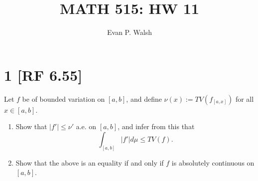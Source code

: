 \documentclass[12pt]{article}
\title{MATH 515: HW 11}
\author{Evan P. Walsh}
\begin{document}
\maketitle

\section*{1 [RF 6.55]}
Let $f$ be of bounded variation on $[a,b]$, and define $\nu(x) := TV(f_{[a,x]})$ for all $x \in [a,b]$.
\begin{enumerate}[label=(\roman*)]
\item Show that $|f'| \leq \nu'$ a.e. on $[a,b]$, and infer from this that 
\[ \int_{[a,b]}|f'|d\mu \leq TV(f). \]
\item Show that the above is an equality if and only if $f$ is absolutely continuous on $[a,b]$.
\end{enumerate}
\end{document}
